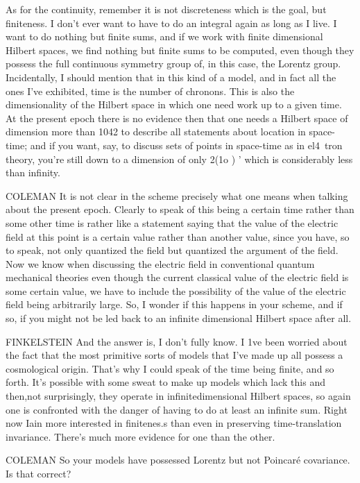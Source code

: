 As for the continuity, remember it is not discreteness which is the goal, but
finiteness. I don't ever want to have to do an integral again as long as I live.
I want to do nothing but finite sums, and if we work with finite dimensional
Hilbert spaces, we find nothing but finite sums to be computed, even though they
possess the full continuous symmetry group of, in this case, the Lorentz group.
Incidentally, I should mention that in this kind of a model, and in fact all the
ones I've exhibited, time is the number of chronons. This is also the
dimensionality of the Hilbert space in which one need work up to a given time. At
the present epoch there is no evidence then that one needs a Hilbert space of
dimension more than 1042 to describe all statements about location in space-time;
and if you want, say, to discuss sets of points in space-time as in el4~tron
theory, you're still down to a dimension of only 2(1o ) ' which is considerably
less than infinity.

COLEMAN It is not clear in the scheme precisely what one means when talking about
the present epoch. Clearly to speak of this being a certain time rather than some
other time is rather like a statement saying that the value of the electric field
at this point is a certain value rather than another value, since you have, so to
speak, not only quantized the field but quantized the argument of the field. Now
we know when discussing the electric field in conventional quantum mechanical
theories even though the current classical value of the electric field is some
certain value, we have to include the possibility of the value of the electric
field being arbitrarily large. So, I wonder if this happens in your scheme, and
if so, if you might not be led back to an infinite dimensional Hilbert space
after all.

FINKELSTEIN And the answer is, I don't fully know. I 1ve been worried about the
fact that the most primitive sorts of models that I've made up all possess a
cosmological origin. That's why I could speak of the time being finite, and so
forth. It's possible with some sweat to make up models which lack this and
then,not surprisingly, they operate in infinite­dimensional Hilbert spaces, so
again one is confronted with the danger of having to do at least an infinite sum.
Right now Iain more interested in finitenes.s than even in preserving
time-translation invariance. There's much more evidence for one than the other.

COLEMAN So your models have possessed Lorentz but not Poincar\'e covariance. Is
that correct?


